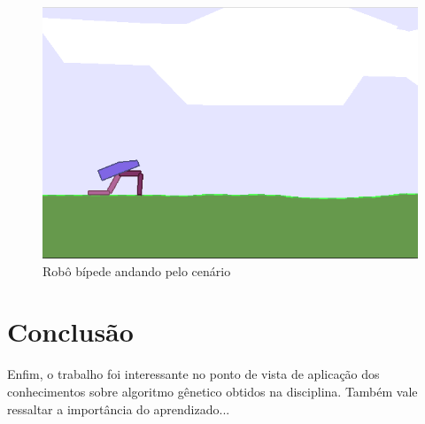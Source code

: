 \documentclass[article, a4paper, 12pt]{article}
\begin{document}
\begin{figure}[!htb]
     \centering
     \includegraphics[scale=0.5]{img/robot_walk.png}
     \caption{Robô bípede andando pelo cenário}
     \label{fig:robotwalk}
\end{figure}

\section{Conclusão}

\hspace{1cm}Enfim, o trabalho foi interessante no ponto de vista de aplicação dos conhecimentos sobre algoritmo gênetico obtidos na disciplina. Também vale ressaltar a importância do aprendizado... 
\end{document}
